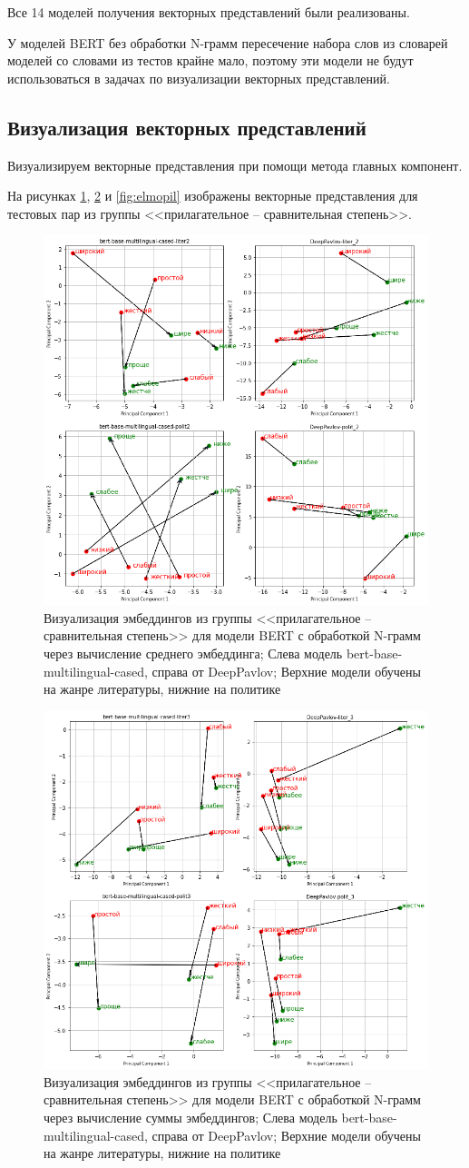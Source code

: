 \documentclass[a4paper,14pt]{article}
\begin{document}
Все 14 моделей получения векторных представлений были реализованы.

У моделей BERT без обработки N-грамм пересечение набора слов из словарей моделей со словами из тестов крайне мало, поэтому эти модели не будут использоваться в задачах по визуализации векторных представлений.



\subsection{Визуализация векторных представлений}

Визуализируем векторные представления при помощи метода главных компонент.

На рисунках \ref{fig:pril2}, \ref{fig:pril3} и \ref{fig:elmopil} изображены векторные представления для тестовых пар из группы <<прилагательное -- сравнительная степень>>.

\begin{figure}[H]
	\centering
	\includegraphics[width=0.5\linewidth]{image/pril_2}
	\caption{Визуализация эмбеддингов из группы <<прилагательное -- сравнительная степень>> для модели BERT с обработкой N-грамм через вычисление среднего эмбеддинга; Слева модель bert-base-multilingual-cased, справа от DeepPavlov; Верхние модели обучены на жанре литературы, нижние на политике}
	\label{fig:pril2}
\end{figure}

\begin{figure}[H]
	\centering
	\includegraphics[width=0.5\linewidth]{image/pril_3}
	\caption{Визуализация эмбеддингов из группы <<прилагательное -- сравнительная степень>> для модели BERT с обработкой N-грамм через вычисление суммы эмбеддингов; Слева модель bert-base-multilingual-cased, справа от DeepPavlov; Верхние модели обучены на жанре литературы, нижние на политике}
	\label{fig:pril3}
\end{figure}
\end{document}
